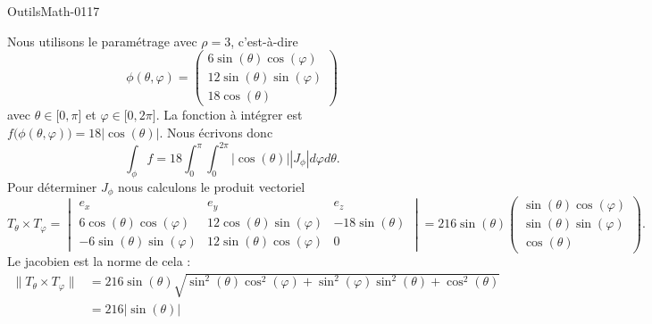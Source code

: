 
\begin{corrige}{OutilsMath-0117}

    Nous utilisons le paramétrage avec \( \rho=3\), c'est-à-dire
    \begin{equation}
        \phi(\theta,\varphi)=\begin{pmatrix}
            6\sin(\theta)\cos(\varphi)    \\ 
            12\sin(\theta)\sin(\varphi)    \\ 
            18\cos(\theta)    
        \end{pmatrix}
    \end{equation}
    avec \( \theta\in\mathopen[ 0 , \pi \mathclose]\) et \( \varphi\in\mathopen[ 0 , 2\pi \mathclose]\). La fonction à intégrer est \( f\big( \phi(\theta,\varphi) \big)=18| \cos(\theta) |\). Nous écrivons donc
    \begin{equation}
        \int_{\phi}f=18\int_0^{\pi}\int_0^{2\pi}| \cos(\theta) | |J_{\phi} |d\varphi d\theta.
    \end{equation}
    Pour déterminer \( J_{\phi}\) nous calculons le produit vectoriel
    \begin{equation}
        T_{\theta}\times T_{\varphi}=\begin{vmatrix}
            e_x    &   e_y    &   e_z    \\
            6\cos(\theta)\cos(\varphi)    &  12\cos(\theta)\sin(\varphi)     &   -18\sin(\theta)    \\
            -6\sin(\theta)\sin(\varphi)    &   12\sin(\theta)\cos(\varphi)    &   0
        \end{vmatrix}=216\sin(\theta)\begin{pmatrix}
            \sin(\theta)\cos(\varphi)    \\ 
            \sin(\theta)\sin(\varphi)    \\ 
            \cos(\theta)    
        \end{pmatrix}.
    \end{equation}
    Le jacobien est la norme de cela :
    \begin{subequations}
        \begin{align}
            \| T_{\theta}\times T_{\varphi} \|&=216\sin(\theta)\sqrt{\sin^2(\theta)\cos^2(\varphi)+\sin^2(\varphi)\sin^2(\theta)+\cos^2(\theta)}\\
            &=216|\sin(\theta)|\\

\end{align}
\end{subequations}
\end{corrige}
